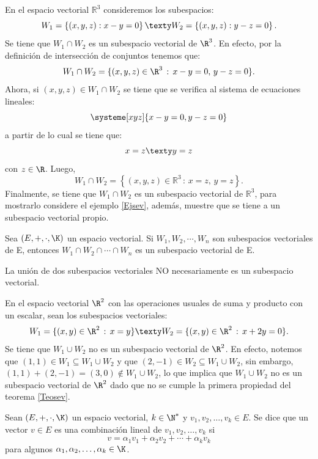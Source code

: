 \documentclass[compacto,10pt]{pubciencias-notas}
\begin{document}
\begin{ejem}\hspace{0pt} En el espacio vectorial $\mathbb{R}^{3}$ consideremos los subespacios:
\[
    W_{1}=\left\{(x,y,z):x-y=0\right\}
    \texty
    W_{2}=\left\{(x,y,z):y-z=0\right\}.\]
Se tiene que $W_{1}\cap W_{2}$ es un subespacio vectorial de $\R^{3}$. En efecto, por la definición de intersección de conjuntos tenemos que:
\[
    W_{1} \cap W_{2} = \{(x,y,z)\in\R^{3}\,:\,x-y=0,\,y-z=0\}.
\]
Ahora, si $(x,y,z)\in W_{1} \cap W_{2}$ se tiene que se verifica al sistema de ecuaciones lineales:
\[
    \systeme[xyz]{x-y=0,y-z=0}
\]
a partir de lo cual se tiene que:
\[
    x= z \texty y = z
\]
con $z\in\R$. Luego, 
\[
    W_{1}\cap W_{2}=\left\{(x,y,z)\in \mathbb{R}^{3}\,:\,x=z,\,y=z\right\}.
\]
Finalmente, se tiene que $W_{1} \cap W_{2}$ es un subespacio vectorial de $\mathbb{R}^{3}$, para mostrarlo considere el ejemplo \ref{Ejsev}, además, muestre que se tiene a un subespacio vectorial propio.
\end{ejem}

\begin{cor}
    Sea $(E, +, \cdot, \K)$ un espacio vectorial. Si $W_{1}, W_{2}, \cdots, W_{n}$ son subespacios vectoriales de E, entonces $W_{1} \cap W_{2} \cap \cdots \cap W_{n}$ es un subespacio vectorial de E.
\end{cor}

\begin{advertencia}
La unión de dos subespacios vectoriales NO necesariamente es un subespacio vectorial.
\end{advertencia}

\begin{ejem}\hspace{0pt} En el espacio vectorial $\R^{2}$ con las operaciones usuales de suma y producto con un escalar, sean los subespacios vectoriales:
\[
    W_{1} = \{(x,y)\in\R^{2}\,:\,x=y\}
    \texty
    W_{2} = \{(x,y)\in\R^{2}\,:\,x+2y=0\}.
\]
Se tiene que $W_{1} \cup W_{2}$ no es un subespacio vectorial de $\R^{2}$. En efecto, notemos que $(1,1)\in W_{1} \subseteq W_{1} \cup W_{2}$ y que $(2,-1)\in W_{2} \subseteq W_{1} \cup W_{2}$, sin embargo, $(1,1) + (2,-1) = (3,0) \notin W_{1} \cup W_{2}$, lo que implica que $W_{1} \cup W_{2}$ no es un subespacio vectorial de $\R^{2}$ dado que no se cumple la primera propiedad del teorema \ref{Teosev}.
\end{ejem}

\begin{defi}
    Sean $(E,+,\cdot,\K)$ un espacio vectorial, $k\in\N^*$ y $v_1, v_2, \ldots, v_k \in E$. Se dice que un vector $v \in E$ es una combinación lineal de 
    $v_1, v_2, \ldots, v_k$ si 
    \[
        v = \alpha_1 v_1 + \alpha_2 v_2 + \cdots + \alpha_k v_k
    \]
    para algunos $\alpha_1, \alpha_2, \ldots, \alpha_k \in \K$.
\end{defi}
\end{document}
